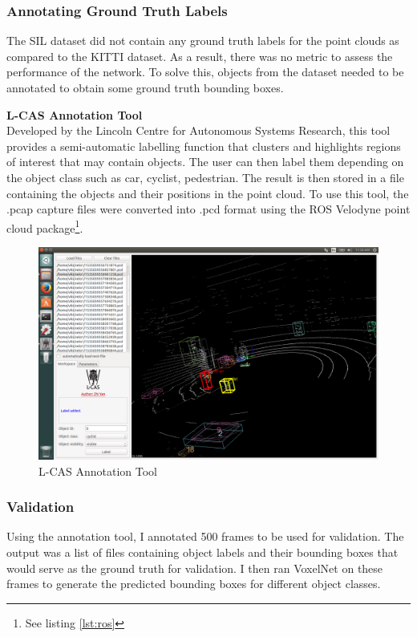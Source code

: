 \subsubsection*{Annotating Ground Truth Labels}
The SIL dataset did not contain any ground truth labels for the point clouds as compared to the KITTI dataset. As a result, there was no metric to assess the performance of the network. To solve this, objects from the dataset needed to be annotated to obtain some ground truth bounding boxes. 

\noindent
\textbf{L-CAS Annotation Tool} \\ 
Developed by the Lincoln Centre for Autonomous Systems Research, this tool provides a semi-automatic labelling function that clusters and highlights regions of interest that may contain objects\cite{yz17iros}. The user can then label them depending on the object class such as car, cyclist, pedestrian. The result is then stored in a file containing the objects and their positions in the point cloud. 
To use this tool, the .pcap capture files were converted into .pcd format using the 
ROS Velodyne point cloud package\footnote{See listing \ref{lst:ros}}. 

\begin{figure}[h]
	
	\includegraphics[width=\linewidth]{images/annot.png}
	\caption{L-CAS Annotation Tool}
	\label{fig:annot}
\end{figure}

\subsubsection{Validation}
Using the annotation tool, I annotated 500 frames to be used for validation. The output was a list of files containing object labels and their bounding boxes that would serve as the ground truth for validation. 
I then  ran VoxelNet on these frames to generate the predicted bounding boxes for different object classes.  


